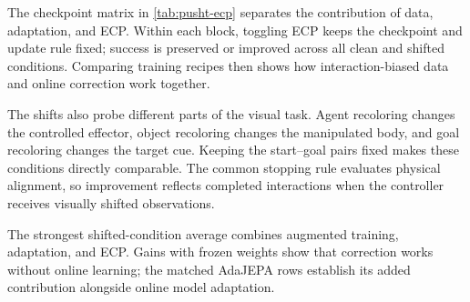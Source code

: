 The checkpoint matrix in \cref{tab:pusht-ecp} separates the contribution of data, adaptation, and ECP. Within each block, toggling ECP keeps the checkpoint and update rule fixed; success is preserved or improved across all clean and shifted conditions. Comparing training recipes then shows how interaction-biased data and online correction work together.

The shifts also probe different parts of the visual task. Agent recoloring changes the controlled effector, object recoloring changes the manipulated body, and goal recoloring changes the target cue. Keeping the start--goal pairs fixed makes these conditions directly comparable. The common stopping rule evaluates physical alignment, so improvement reflects completed interactions when the controller receives visually shifted observations.

The strongest shifted-condition average combines augmented training, adaptation, and ECP. Gains with frozen weights show that correction works without online learning; the matched AdaJEPA rows establish its added contribution alongside online model adaptation.

